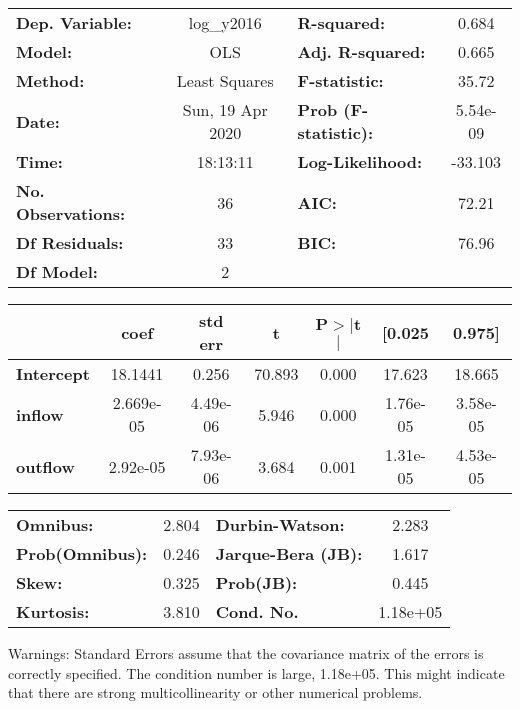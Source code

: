 \begin{center}
\begin{tabular}{lclc}
\toprule
\textbf{Dep. Variable:}    &    log\_y2016    & \textbf{  R-squared:         } &     0.684   \\
\textbf{Model:}            &       OLS        & \textbf{  Adj. R-squared:    } &     0.665   \\
\textbf{Method:}           &  Least Squares   & \textbf{  F-statistic:       } &     35.72   \\
\textbf{Date:}             & Sun, 19 Apr 2020 & \textbf{  Prob (F-statistic):} &  5.54e-09   \\
\textbf{Time:}             &     18:13:11     & \textbf{  Log-Likelihood:    } &   -33.103   \\
\textbf{No. Observations:} &          36      & \textbf{  AIC:               } &     72.21   \\
\textbf{Df Residuals:}     &          33      & \textbf{  BIC:               } &     76.96   \\
\textbf{Df Model:}         &           2      & \textbf{                     } &             \\
\bottomrule
\end{tabular}
\begin{tabular}{lcccccc}
                   & \textbf{coef} & \textbf{std err} & \textbf{t} & \textbf{P$> |$t$|$} & \textbf{[0.025} & \textbf{0.975]}  \\
\midrule
\textbf{Intercept} &      18.1441  &        0.256     &    70.893  &         0.000        &       17.623    &       18.665     \\
\textbf{inflow}    &    2.669e-05  &     4.49e-06     &     5.946  &         0.000        &     1.76e-05    &     3.58e-05     \\
\textbf{outflow}   &     2.92e-05  &     7.93e-06     &     3.684  &         0.001        &     1.31e-05    &     4.53e-05     \\
\bottomrule
\end{tabular}
\begin{tabular}{lclc}
\textbf{Omnibus:}       &  2.804 & \textbf{  Durbin-Watson:     } &    2.283  \\
\textbf{Prob(Omnibus):} &  0.246 & \textbf{  Jarque-Bera (JB):  } &    1.617  \\
\textbf{Skew:}          &  0.325 & \textbf{  Prob(JB):          } &    0.445  \\
\textbf{Kurtosis:}      &  3.810 & \textbf{  Cond. No.          } & 1.18e+05  \\
\bottomrule
\end{tabular}
\end{center}

Warnings: \newline
 [1] Standard Errors assume that the covariance matrix of the errors is correctly specified. \newline
 [2] The condition number is large, 1.18e+05. This might indicate that there are \newline
 strong multicollinearity or other numerical problems.